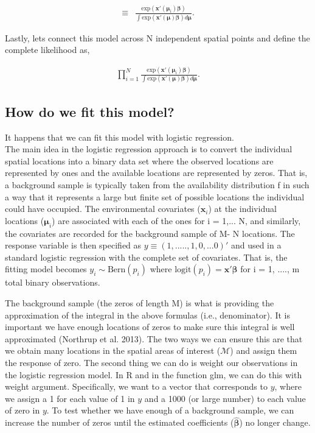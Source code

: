 \documentclass[12pt]{article}
\begin{document}
\begin{align*}
[\boldsymbol{\mu}_{i}| \boldsymbol{\beta}] \equiv &  \frac{\text{exp}(\textbf{x}'(\boldsymbol{\mu}_{i}) \boldsymbol{\beta})}{\int \text{exp}(\textbf{x}'(\boldsymbol{\mu}) \boldsymbol{\beta})d\boldsymbol{\mu}}.
\end{align*}

Lastly, lets connect this model across N independent spatial points and define the complete likelihood as,

\begin{align*}
 \prod_{i=1}^{N}  \frac{\text{exp}(\textbf{x}'(\boldsymbol{\mu}_{i}) \boldsymbol{\beta})}{\int \text{exp}(\textbf{x}'(\boldsymbol{\mu}) \boldsymbol{\beta})d\boldsymbol{\mu}}.
\end{align*}

\subsection{How do we fit this model?}

It happens that we can fit this model with logistic regression. \\

The main idea in the logistic regression approach is to convert the individual spatial locations into a binary data set where the observed locations are represented by ones and the available locations are represented by zeros. That is, a background sample is typically taken from the availability distribution f in such a way that it represents a large but finite set of possible locations the individual could have occupied. The environmental covariates ($\textbf{x}_{i}$) at the individual locations ($\boldsymbol{\mu}_{i}$) are associated with each of the ones for i = 1,... N, and similarly, the covariates are recorded for the background sample of M- N locations. The response variable is then specified as $y \equiv (1,.....,1,0,...0)'$ and used in a standard logistic regression with the complete set of covariates. That is, the fitting model becomes $y_{i}\sim \text{Bern}(p_{i})$ where $\text{logit}(p_i) = \textbf{x}'\boldsymbol{\beta}$ for i = 1, ...., m total binary observations.

The background sample (the zeros of length M) is what is providing the approximation of the integral in the above formulas (i.e., denominator). It is important we have enough locations of zeros to make sure this integral is well approximated (Northrup et al. 2013). The two ways we can ensure this are that we obtain many locations in the spatial areas of interest ($\mathcal{M}$) and assign them the response of zero. The second thing we can do is weight our observations in the logistic regression model. In R and in the function glm, we can do this with weight argument. Specifically, we want to a vector that corresponds to $y$, where we assign a 1 for each value of 1 in $y$ and a 1000 (or large number) to each value of zero in $y$. To test whether we have enough of a background sample, we can increase the number of zeros until the estimated coefficients ($\hat{\boldsymbol{\beta}}$) no longer change.
\end{document}

